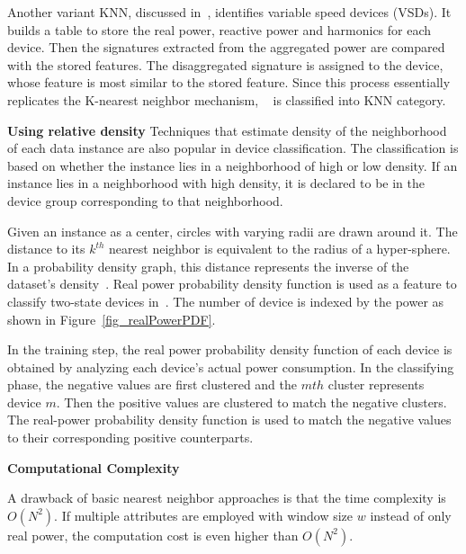 
Another variant KNN, discussed in~\cite{lee2005estimation},  
identifies variable speed devices (VSDs).
It builds a table to store
the real power, reactive power and harmonics for each device.
Then the signatures extracted from the aggregated power
are compared with the stored features.
The disaggregated signature is assigned to the device,
whose feature is most similar to the stored feature.
Since this process essentially replicates the K-nearest neighbor mechanism,
~\cite{lee2005estimation} is classified into KNN category.


\textbf{Using relative density}
Techniques that estimate density of the neighborhood of each data instance are also popular in device classification.
The classification is based on whether the instance lies in a neighborhood of high or low density.  If an instance lies in a neighborhood with high density, it is declared to be in the device group corresponding to that neighborhood. 

Given an instance as a center, circles with varying radii are drawn around it.
The distance to its $k^{th}$ nearest neighbor is equivalent 
to the radius of a hyper-sphere. 
In a probability density graph, 
this distance represents the inverse of 
the dataset's density~\cite{kolter2010redd}.
Real power probability density function is used 
as a feature to classify two-state devices in~\cite{zeifman2011viterbi}.
The number of device is indexed by the power 
as shown in Figure~\ref{fig_realPowerPDF}.

In the training step, 
the real power probability density function of each device 
is obtained by analyzing each device's actual power consumption. 
In the classifying phase,
the negative values are first clustered and the $mth$ cluster
represents device $m$.
Then the positive values are clustered to match the negative clusters.
The real-power probability density function is used to match the negative values to their corresponding positive counterparts.


\textbf{Computational Complexity}

A drawback of basic nearest neighbor approaches is that the 
time complexity is $O(N^2)$.
If multiple attributes are employed with window size $w$ instead of only 
real power, the computation cost is even higher than $O(N^2)$. 


